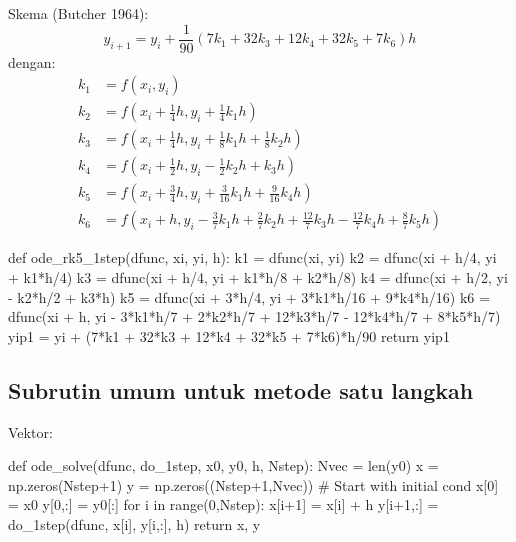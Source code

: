 Skema (Butcher 1964):
\begin{equation*}
y_{i+1} = y_i + \frac{1}{90} ( 7 k_1 + 32 k_3 + 12 k_4 + 32 k_5 + 7 k_6) h
\end{equation*}
dengan:
\begin{align*}
k_1 & = f(x_i, y_i) \\
k_2 & = f\left( x_i + \frac{1}{4}h, y_i + \frac{1}{4} k_1 h \right) \\
k_3 & = f\left( x_i + \frac{1}{4}h, y_i + \frac{1}{8} k_1 h + \frac{1}{8} k_2 h \right) \\
k_4 & = f\left( x_i + \frac{1}{2}h, y_i - \frac{1}{2} k_2 h + k_3 h \right) \\
k_5 & = f\left( x_i + \frac{3}{4}h, y_i + \frac{3}{16} k_1 h + \frac{9}{16} k_4 h \right) \\
k_6 & = f\left( x_i + h, y_i - \frac{3}{7} k_1 h + \frac{2}{7} k_2 h +
\frac{12}{7}k_3 h - \frac{12}{7}k_4 h + \frac{8}{7}k_5 h \right)
\end{align*}

\begin{pythoncode}
def ode_rk5_1step(dfunc, xi, yi, h):
    k1 = dfunc(xi, yi)
    k2 = dfunc(xi + h/4, yi + k1*h/4)
    k3 = dfunc(xi + h/4, yi + k1*h/8 + k2*h/8)
    k4 = dfunc(xi + h/2, yi - k2*h/2 + k3*h)
    k5 = dfunc(xi + 3*h/4, yi + 3*k1*h/16 + 9*k4*h/16)
    k6 = dfunc(xi + h, yi - 3*k1*h/7 + 2*k2*h/7 + 12*k3*h/7 - 12*k4*h/7 + 8*k5*h/7)
    yip1 = yi + (7*k1 + 32*k3 + 12*k4 + 32*k5 + 7*k6)*h/90
    return yip1
\end{pythoncode}


\subsection{Subrutin umum untuk metode satu langkah}

Vektor:
\begin{pythoncode}
def ode_solve(dfunc, do_1step, x0, y0, h, Nstep):
    Nvec = len(y0)
    x = np.zeros(Nstep+1)
    y = np.zeros((Nstep+1,Nvec))
    # Start with initial cond
    x[0] = x0
    y[0,:] = y0[:]
    for i in range(0,Nstep):
        x[i+1] = x[i] + h
        y[i+1,:] = do_1step(dfunc, x[i], y[i,:], h)
    return x, y
\end{pythoncode}

